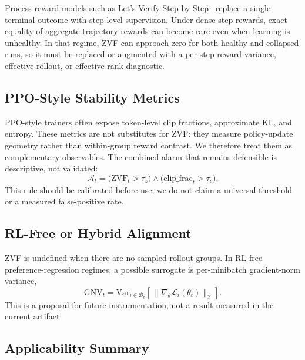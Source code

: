 Process reward models such as Let's Verify Step by Step~\cite{lightman2023prm}
replace a single terminal outcome with step-level supervision. Under dense
step rewards, exact equality of aggregate trajectory rewards can become rare
even when learning is unhealthy. In that regime, ZVF can approach zero for both
healthy and collapsed runs, so it must be replaced or augmented with a
per-step reward-variance, effective-rollout, or effective-rank diagnostic.

\subsection{PPO-Style Stability Metrics}
\label{sec:ext:stppo}

PPO-style trainers often expose token-level clip fractions, approximate KL, and
entropy. These metrics are not substitutes for ZVF: they measure policy-update
geometry rather than within-group reward contrast. We therefore treat them as
complementary observables. The combined alarm that remains defensible is
descriptive, not validated:
\begin{equation}
\mathcal{A}_t =
\bigl(\mathrm{ZVF}_t > \tau_z\bigr)
\wedge
\bigl(\mathrm{clip\_frac}_t > \tau_c\bigr).
\label{eq:combined}
\end{equation}
This rule should be calibrated before use; we do not claim a universal
threshold or a measured false-positive rate.

\subsection{RL-Free or Hybrid Alignment}
\label{sec:ext:dar}

ZVF is undefined when there are no sampled rollout groups. In RL-free
preference-regression regimes, a possible surrogate is per-minibatch
gradient-norm variance,
\[
\mathrm{GNV}_t =
\mathrm{Var}_{i \in \mathcal{B}_t}
\left[\,\lVert \nabla_\theta \mathcal{L}_i(\theta_t) \rVert_2\,\right].
\]
This is a proposal for future instrumentation, not a result measured in the
current artifact.

\subsection{Applicability Summary}

